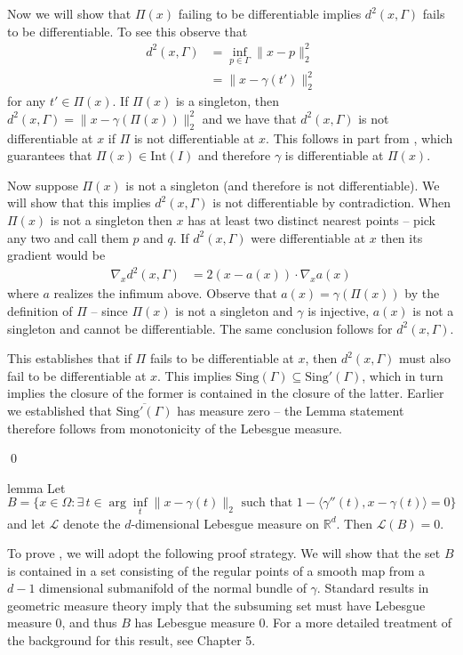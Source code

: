 \documentclass[11pt]{article}
\begin{document}
Now we will show that $\Pi(x)$ failing to be differentiable implies $d^2(x, \Gamma)$ fails to be differentiable. To see this observe that
\begin{align}
    d^2(x, \Gamma) &= \inf_{p \in \Gamma}\|x - p\|_2^2 \\ \label{eq: distance to Gamma}
    &= \|x - \gamma(t')\|_2^2
\end{align}
for any $t' \in \Pi(x)$. If $\Pi(x)$ is a singleton, then $d^2(x,\Gamma) = \|x - \gamma(\Pi(x))\|_2^2$ and we have that $d^2(x,\Gamma)$ is not differentiable at $x$ if $\Pi$ is not differentiable at $x$. This follows in part from , which guarantees that $\Pi(x) \in \text{Int}(I)$ and therefore $\gamma$ is differentiable at $\Pi(x)$.

Now suppose $\Pi(x)$ is not a singleton (and therefore is not differentiable). We will show that this implies $d^2(x,\Gamma)$ is not differentiable by contradiction. When $\Pi(x)$ is not a singleton then $x$ has at least two distinct nearest points -- pick any two and call them $p$ and $q$. If $d^2(x,\Gamma)$ were differentiable at $x$ then its gradient would be 
\begin{align}
    \nabla_xd^2(x, \Gamma) &= 2(x - a(x))\cdot \nabla_xa(x)
\end{align}
where $a$ realizes the infimum above. Observe that $a(x) = \gamma(\Pi(x))$ by the definition of $\Pi$ -- since $\Pi(x)$ is not a singleton and $\gamma$ is injective, $a(x)$ is not a singleton and cannot be differentiable. The same conclusion follows for $d^2(x, \Gamma).$

This establishes that if $\Pi$ fails to be differentiable at $x$, then $d^2(x, \Gamma)$ must also fail to be differentiable at $x$. This implies $\text{Sing}(\Gamma) \subseteq \text{Sing}'(\Gamma)$, which in turn implies the closure of the former is contained in the closure of the latter. Earlier we established that $\overline{\text{Sing}'(\Gamma)}$ has measure zero -- the Lemma statement therefore follows from monotonicity of the Lebesgue measure.

\qed{}

\begin{restatable}{lemma}{} \label{lemma: IFT degen}
    Let
    \begin{equation} 
    B= \{x \in \Omega : \exists \,t \in \arg\inf_t \|x-\gamma(t)\|_2 \text{ such that } 1 - \langle\gamma''(t), x-\gamma(t)\rangle = 0 \} \label{eq: ift degeneracy set}
    \end{equation}
    and let $\mathcal{L}$ denote the $d$-dimensional Lebesgue measure on $\mathbb{R}^d$. Then $\mathcal{L}(B) = 0.$
\end{restatable}
\noindent To prove , we will adopt the following proof strategy. We will show that the set $B$ is contained in a set consisting of the regular points of a smooth map from a $d-1$ dimensional submanifold of the normal bundle of $\gamma$. Standard results in geometric measure theory imply that the subsuming set must have Lebesgue measure $0$, and thus $B$ has Lebesgue measure $0$. For a more detailed treatment of the background for this result, see \citet{lee2003smooth} Chapter 5. 
\end{document}
